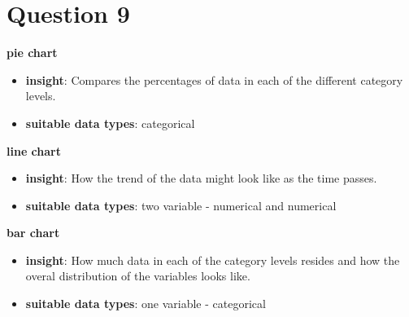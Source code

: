 \documentclass[a4paper,12pt]{article}
\begin{document}
\section*{Question 9}
\textbf{pie chart}
\begin{itemize}
    \item \textbf{insight}: Compares the percentages of data in each of the different category levels.
    \item \textbf{suitable data types}: categorical
\end{itemize}

\textbf{line chart}
\begin{itemize}
    \item \textbf{insight}: How the trend of the data might look like as the time passes.
    \item \textbf{suitable data types}: two variable - numerical and numerical 
\end{itemize}

\textbf{bar chart}
\begin{itemize}
    \item \textbf{insight}: How much data in each of the category levels resides and how the overal distribution of the variables looks like.
    \item \textbf{suitable data types}: one variable - categorical
\end{itemize}
\end{document}

